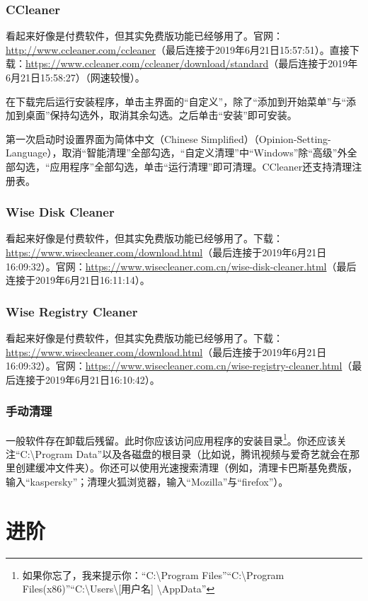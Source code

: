 \documentclass{book}
\begin{document}
\subsection{CCleaner}
看起来好像是付费软件，但其实免费版功能已经够用了。官网：\url{http://www.ccleaner.com/ccleaner}（最后连接于2019年6月21日15:57:51）。直接下载：\url{https://www.ccleaner.com/ccleaner/download/standard}（最后连接于2019年6月21日15:58:27）（网速较慢）。\par
在下载完后运行安装程序，单击主界面的“自定义”，除了“添加到开始菜单”与“添加到桌面”保持勾选外，取消其余勾选。之后单击“安装”即可安装。\par
第一次启动时设置界面为简体中文（Chinese Simplified）（Opinion-Setting-Language），取消“智能清理”全部勾选，“自定义清理”中“Windows”除“高级”外全部勾选，“应用程序”全部勾选，单击“运行清理”即可清理。CCleaner还支持清理注册表。
\subsection{Wise Disk Cleaner}
看起来好像是付费软件，但其实免费版功能已经够用了。下载：\url{https://www.wisecleaner.com/download.html}（最后连接于2019年6月21日16:09:32）。官网：\url{https://www.wisecleaner.com.cn/wise-disk-cleaner.html}（最后连接于2019年6月21日16:11:14）。
\subsection{Wise Registry Cleaner}
看起来好像是付费软件，但其实免费版功能已经够用了。下载：\url{https://www.wisecleaner.com/download.html}（最后连接于2019年6月21日16:09:32）。官网：\url{https://www.wisecleaner.com.cn/wise-registry-cleaner.html}（最后连接于2019年6月21日16:10:42）。
\subsection{手动清理}
一般软件存在卸载后残留。此时你应该访问应用程序的安装目录\footnote{如果你忘了，我来提示你：“C:\textbackslash Program Files”“C:\textbackslash Program Files(x86)”“C:\textbackslash Users\textbackslash [用户名] \textbackslash AppData”}。你还应该关注“C:\textbackslash Program Data”以及各磁盘的根目录（比如说，腾讯视频与爱奇艺就会在那里创建缓冲文件夹）。你还可以使用光速搜索清理（例如，清理卡巴斯基免费版，输入“kaspersky”；清理火狐浏览器，输入“Mozilla”与“firefox”）。{\color{red}{注意！你只应清理你熟知的文件。}}
\chapter{进阶}
\end{document}
